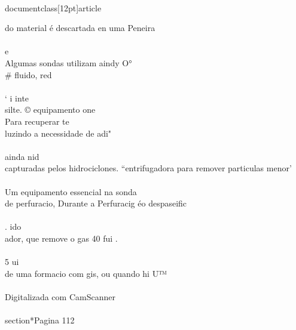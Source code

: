 \\documentclass[12pt]{article}
\begin{document}
do material é descartada en uma Peneira\\
\\
e\\
Algumas sondas utilizam aindy O° \\# fluido, red\\
\\
‘ i inte\\
silte. © equipamento one\\
Para recuperar te\\
luzindo a necessidade de adi"\\
\\
ainda nid\\
capturadas pelos hidrociclones. “entrifugadora para remover particulas menor’\\
\\
Um equipamento essencial na sonda\\
de perfuracio, Durante a Perfuracig éo despaseific\\
\\
. ido\\
ador, que remove o gas 40 fui .\\
\\
5 ui\\
de uma formacio com gis, ou quando hi U™\\
\\
Digitalizada com CamScanner\\

\\section*{Pagina 112}
\end{document}
